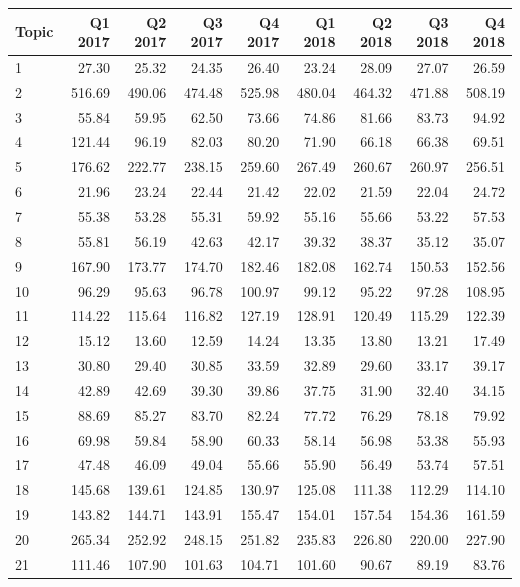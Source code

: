 \begin{table}[]
		\small
	\begin{tabular}{l|rrrrrrrr}
		Topic & Q1 2017 & Q2 2017 & Q3 2017 & Q4 2017 & Q1 2018 & Q2 2018 & Q3 2018 & Q4 2018 \\
		\hline
		1 & 27.30 & 25.32 & 24.35 & 26.40 & 23.24 & 28.09 & 27.07 & 26.59 \\
		2 & 516.69 & 490.06 & 474.48 & 525.98 & 480.04 & 464.32 & 471.88 & 508.19 \\
		3 & 55.84 & 59.95 & 62.50 & 73.66 & 74.86 & 81.66 & 83.73 & 94.92 \\
		4 & 121.44 & 96.19 & 82.03 & 80.20 & 71.90 & 66.18 & 66.38 & 69.51 \\
		5 & 176.62 & 222.77 & 238.15 & 259.60 & 267.49 & 260.67 & 260.97 & 256.51 \\
		6 & 21.96 & 23.24 & 22.44 & 21.42 & 22.02 & 21.59 & 22.04 & 24.72 \\
		7 & 55.38 & 53.28 & 55.31 & 59.92 & 55.16 & 55.66 & 53.22 & 57.53 \\
		8 & 55.81 & 56.19 & 42.63 & 42.17 & 39.32 & 38.37 & 35.12 & 35.07 \\
		9 & 167.90 & 173.77 & 174.70 & 182.46 & 182.08 & 162.74 & 150.53 & 152.56 \\
		10 & 96.29 & 95.63 & 96.78 & 100.97 & 99.12 & 95.22 & 97.28 & 108.95 \\
		11 & 114.22 & 115.64 & 116.82 & 127.19 & 128.91 & 120.49 & 115.29 & 122.39 \\
		12 & 15.12 & 13.60 & 12.59 & 14.24 & 13.35 & 13.80 & 13.21 & 17.49 \\
		13 & 30.80 & 29.40 & 30.85 & 33.59 & 32.89 & 29.60 & 33.17 & 39.17 \\
		14 & 42.89 & 42.69 & 39.30 & 39.86 & 37.75 & 31.90 & 32.40 & 34.15 \\
		15 & 88.69 & 85.27 & 83.70 & 82.24 & 77.72 & 76.29 & 78.18 & 79.92 \\
		16 & 69.98 & 59.84 & 58.90 & 60.33 & 58.14 & 56.98 & 53.38 & 55.93 \\
		17 & 47.48 & 46.09 & 49.04 & 55.66 & 55.90 & 56.49 & 53.74 & 57.51 \\
		18 & 145.68 & 139.61 & 124.85 & 130.97 & 125.08 & 111.38 & 112.29 & 114.10 \\
		19 & 143.82 & 144.71 & 143.91 & 155.47 & 154.01 & 157.54 & 154.36 & 161.59 \\
		20 & 265.34 & 252.92 & 248.15 & 251.82 & 235.83 & 226.80 & 220.00 & 227.90 \\
		21 & 111.46 & 107.90 & 101.63 & 104.71 & 101.60 & 90.67 & 89.19 & 83.76 \\

\end{tabular}
\end{table}
